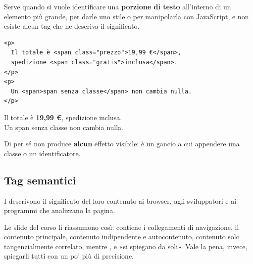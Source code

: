 Serve quando si vuole identificare una \textbf{porzione di testo} all'interno di
un elemento più grande, per darle uno stile o per manipolarla con JavaScript,
e non esiste alcun tag che ne descriva il significato.

\begin{affianco}[0.55]
\begin{lstlisting}[style=html, name=span.html]
<p>
  Il totale è <span class="prezzo">19,99 €</span>,
  spedizione <span class="gratis">inclusa</span>.
</p>
<p>
  Un <span>span senza classe</span> non cambia nulla.
</p>
\end{lstlisting}
\risultato
\begin{browser}
  Il totale è {\bfseries\color{css-red}19,99 €}, spedizione
  {\color{css-green}inclusa}.\\[6pt]
  Un span senza classe non cambia nulla.
\end{browser}
\end{affianco}

Di per sé  non produce \textbf{alcun} effetto visibile: è un gancio a
cui appendere una classe o un identificatore.


\subsection{Tag semantici}

I  descrivono il significato del loro contenuto ai browser,
agli sviluppatori e ai programmi che analizzano la pagina.

Le slide del corso li riassumono così:  contiene i collegamenti di
navigazione,  il contenuto principale,  contenuto
indipendente e autocontenuto,  contenuto solo tangenzialmente
correlato, mentre ,  e  «si spiegano da soli».
Vale la pena, invece, spiegarli tutti con un po' più di precisione.

